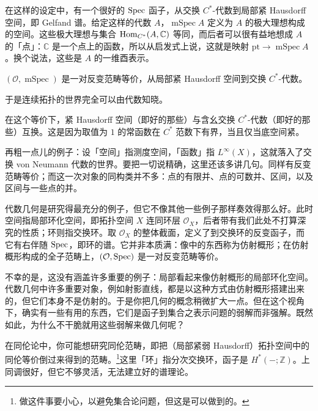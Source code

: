 在这样的设定中，有一个很好的 $\operatorname{Spec}$ 函子，从交换 $C^*$-代数到局部紧 Hausdorff 空间，即 Gelfand 谱。给定这样的代数 $A$，$\operatorname{mSpec}A$ 定义为 $A$ 的极大理想构成的空间。这些极大理想与集合 $\operatorname{Hom}_{C^*}(A,\mathbb{C})$ 等同，而后者可以很有益地想成 $A$ 的「点」：$\mathbb{C}$ 是一个点上的函数，所以从启发式上说，这就是映射 $\mathrm{pt}\to\operatorname{mSpec}A$。换个说法，这些是 $A$ 的一维酉表示。

\begin{theorem}
$(\mathcal{O},\operatorname{mSpec})$ 是一对反变范畴等价，从局部紧 Hausdorff 空间到交换 $C^*$-代数。
\end{theorem}

于是连续拓扑的世界完全可以由代数知晓。

在这个等价下，紧 Hausdorff 空间（即好的那些）与含幺交换 $C^*$-代数（即好的那些）互换。这是因为取值为 $1$ 的常函数在 $C^*$ 范数下有界，当且仅当底空间紧。

\begin{example}
再粗一点儿的例子：设「空间」指测度空间，「函数」指 $L^\infty(X)$，这就落入了交换 von Neumann 代数的世界。要把一切说精确，这里还该多讲几句。同样有反变范畴等价；而这一次对象的同构类并不多：点的有限并、点的可数并、区间，以及区间与一些点的并。
\end{example}

\begin{example}
代数几何是研究得最充分的例子，但它不像其他一些例子那样奏效得那么好。此时空间指局部环化空间，即拓扑空间 $X$ 连同环层 $\mathcal{O}_X$，后者带有我们此处不打算深究的性质；环则指交换环。取 $\mathcal{O}_X$ 的整体截面，定义了到交换环的反变函子，而它有右伴随 $\operatorname{Spec}$，即环的谱。它并非本质满：像中的东西称为仿射概形；在仿射概形构成的全子范畴上，$(\mathcal{O},\operatorname{Spec})$ 是一对反变范畴等价。
\end{example}

不幸的是，这没有涵盖许多重要的例子：局部看起来像仿射概形的局部环化空间。代数几何中许多重要对象，例如射影直线，都是以这种方式由仿射概形搭建出来的，但它们本身不是仿射的。于是你把几何的概念稍微扩大一点。但在这个视角下，确实有一些有用的东西，它们是函子到集合之表示问题的弱解而非强解。既然如此，为什么不干脆就用这些弱解来做几何呢？

\begin{example}
在同伦论中，你可能想研究同伦范畴，即把（局部紧弱 Hausdorff）拓扑空间中的同伦等价倒过来得到的范畴。\footnote{做这件事要小心，以避免集合论问题，但这是可以做到的。}这里「环」指分次交换环，函子是 $H^*(-;\mathbb{Z})$。上同调很好，但它不够灵活，无法建立好的谱理论。
\end{example}

